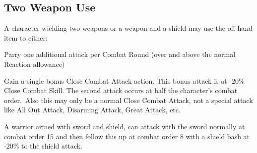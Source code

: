 \subsection{Two Weapon Use}
A character wielding two weapons or a weapon and a shield may use the off-hand item to either: 
\begin{rpg-list}
\item Parry one additional attack per Combat Round (over and above the normal Reaction allowance)
\item Gain a single bonus Close Combat Attack action. This bonus attack is at -20\% Close Combat Skill. The second attack occurs at half the character’s combat order. Also this may only be a normal Close Combat Attack, not a special attack like All Out Attack, Disarming Attack, Great Attack, etc.
\end{rpg-list}

\begin{rpg-examplebox}
	A warrior armed with sword and shield, can attack with the sword normally at combat order 15 and then follow this up at combat order 8 with a shield bash at -20\% to the shield attack.
\end{rpg-examplebox}







